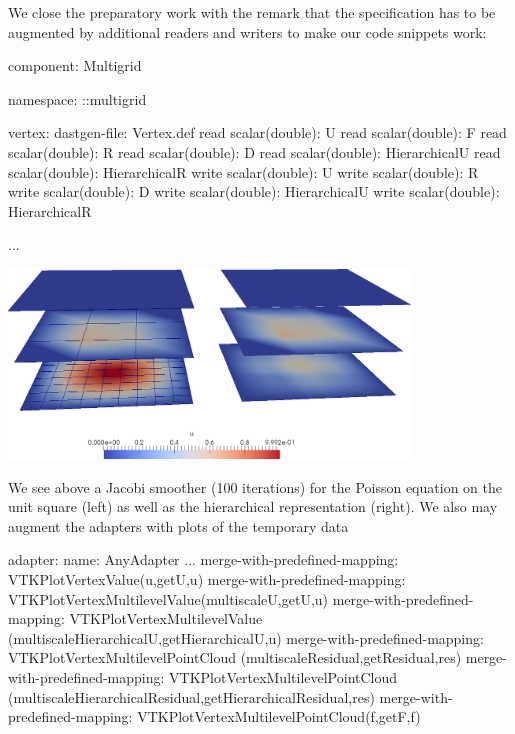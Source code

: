 \noindent
We close the preparatory work with the remark that the specification has to be
augmented by additional readers and writers to make our code snippets work:

\begin{code}
component: Multigrid

namespace: ::multigrid

vertex:
  dastgen-file: Vertex.def
  read scalar(double): U
  read scalar(double): F
  read scalar(double): R
  read scalar(double): D
  read scalar(double): HierarchicalU
  read scalar(double): HierarchicalR
  write scalar(double): U
  write scalar(double): R
  write scalar(double): D
  write scalar(double): HierarchicalU
  write scalar(double): HierarchicalR

...
\end{code}

\begin{center}
  \includegraphics[width=0.8\textwidth]{42_matrix-free-multigrid/Hierarchical-Jacobi.png}
\end{center}

\noindent
We see above a Jacobi smoother (100 iterations) for the Poisson equation on the
unit square (left) as well as the hierarchical representation (right).
We also may augment the adapters with plots of the temporary data 

\begin{code}
adapter:
  name: AnyAdapter
  ...
  merge-with-predefined-mapping: VTKPlotVertexValue(u,getU,u)
  merge-with-predefined-mapping: VTKPlotVertexMultilevelValue(multiscaleU,getU,u)
  merge-with-predefined-mapping: VTKPlotVertexMultilevelValue
    (multiscaleHierarchicalU,getHierarchicalU,u)
  merge-with-predefined-mapping: VTKPlotVertexMultilevelPointCloud
    (multiscaleResidual,getResidual,res)
  merge-with-predefined-mapping: VTKPlotVertexMultilevelPointCloud
    (multiscaleHierarchicalResidual,getHierarchicalResidual,res)
  merge-with-predefined-mapping: VTKPlotVertexMultilevelPointCloud(f,getF,f)
\end{code}


